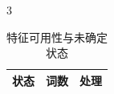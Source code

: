 \begin{PaperTable}{3}

\begin{table}[!htbp]
\centering\caption{特征可用性与未确定状态}
\begin{tabular}{@{}lrl@{}}
\toprule
\begin{minipage}[b]{\dimexpr 0.300000\linewidth-1.200000\tabcolsep\relax}\raggedright
状态\strut
\end{minipage} & \begin{minipage}[b]{\dimexpr 0.120000\linewidth-0.480000\tabcolsep\relax}\raggedleft
词数\strut
\end{minipage} & \begin{minipage}[b]{\dimexpr 0.580000\linewidth-2.320000\tabcolsep\relax}\raggedright
处理\strut
\end{minipage}\tabularnewline
\midrule


\end{tabular}
\end{table}
\end{PaperTable}
